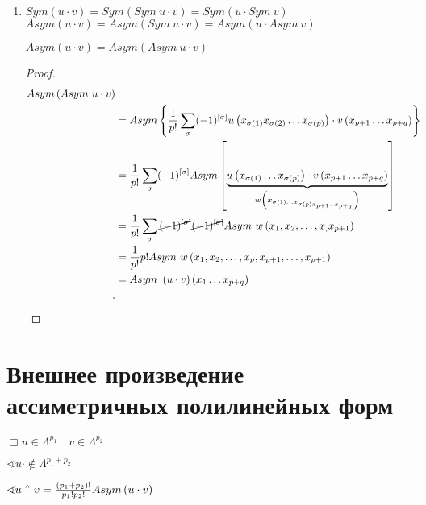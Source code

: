 \documentclass{book}
\let\latexwedge\wedge
\def\wedge{\,\raisebox{0.5ex}{\ensuremath{\scriptscriptstyle\latexwedge}\,}}
\theoremstyle{definition}
\newtheorem*{note}{Замечание}
\begin{document}
\begin{enumerate}
\begin{note}
        $\hat e_y(y^k) = y^k(e_t)$
    \end{note}
\item $Sym\left( u\cdot v \right)  = Sym\left( Sym~u \cdot  v \right)  = Sym\left( u\cdot Sym~v \right) $ 
$Asym\left( u\cdot v \right)  = Asym\left( Sym~u \cdot  v \right)  = Asym\left( u\cdot Asym~v \right) $ 
\begin{statement}
    $Asym\left( u\cdot v \right)  = Asym\left( Asym~u\cdot v \right) $
\end{statement}
\begin{proof}
    \begin{align*}
        Asym\left( Asym~u\cdot v \right) \\
        &= Asym\left\{ \frac{1}{p!}\sum_{\sigma} (-1)^{\left[ \sigma \right] }u\left( x_{\sigma(1)}x_{\sigma(2)}\ldots x_{\sigma(p)} \right)  \cdot v\left( x_{p+1}\ldots x_{p+q} \right)\right\}   \\
        &= \frac{1}{p!}\sum_{\sigma}(-1)^{\left[ \sigma \right] }Asym\left[ \underbrace{u\left( x_{\sigma(1)}\ldots x_{\sigma(p)} \right) \cdot v\left( x_{p+1}\ldots x_{p+q} \right)}\limits_{w\left( x_{\sigma(1)\ldots x_{\sigma(p) x_{p+1} .. x_{p+q}}} \right) }  \right]  \\
        &= \frac{1}{p!} \sum_{\sigma}\cancel{(-1)^{\left[ \sigma \right] }} \cancel{(-1)^{\left[ \sigma \right] }}Asym~w\left( x_1, x_2, \ldots, x_, x_{p+1} \right) \\
        &= \frac{1}{p!}p!Asym~w\left( x_1, x_2, \ldots, x_{p}, x_{p+1}, \ldots, x_{p+1} \right)  \\
        &= Asym~\left( u\cdot v \right) \left( x_1 \ldots x_{p+q} \right)  \\
    .\end{align*}
\end{proof}

\end{enumerate}


\section{Внешнее произведение ассиметричных полилинейных форм}

$\sqsupset u\in \Lambda^{p_1}\quad v\in \Lambda^{p_2}$

$\sphericalangle u\cdot \not\in \Lambda^{p_1+p_2} $

$\sphericalangle u\wedge v = \frac{(p_1+p_2)!}{p_1!p_2!}Asym\left( u\cdot v \right) $
\end{document}

